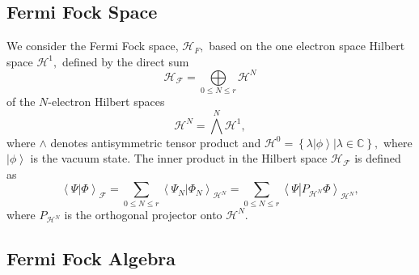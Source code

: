 \documentclass[aps,preprint]{revtex4}%
\begin{document}
\subsection{Fermi Fock Space \label{Fermi Fock Space}}

We consider the Fermi Fock space, $\mathcal{H}_{F},$ based on the one electron
space Hilbert space $\mathcal{H}^{1},$ defined by the direct sum
\begin{equation}
\mathcal{H}_{\mathcal{F}}=\underset{0\leq N\leq r}{\bigoplus}\mathcal{H}^{N}%
\end{equation}
of the $N$-electron Hilbert spaces
\begin{equation}
\mathcal{H}^{N}=\bigwedge\limits^{N}\mathcal{H}^{1},
\end{equation}
where $\wedge$ denotes antisymmetric tensor product and $\mathcal{H}%
^{0}=\left\{  \left.  \lambda\left\vert \phi\right\rangle \right\vert
\lambda\in\mathbb{C}\right\}  ,$ where $\left\vert \phi\right\rangle $ is the
vacuum state. The inner product in the Hilbert space $\mathcal{H}%
_{\mathcal{F}}$ is defined as
\begin{equation}
\left\langle \Psi\left\vert \Phi\right.  \right\rangle _{\mathcal{F}}%
=\sum_{0\leq N\leq r}\left\langle \Psi_{N}\left\vert \Phi_{N}\right.
\right\rangle _{\mathcal{H}^{N}}=\sum_{0\leq N\leq r}\left\langle
\Psi\left\vert P_{\mathcal{H}^{N}}\Phi\right.  \right\rangle _{\mathcal{H}%
^{N}},
\end{equation}
where $P_{\mathcal{H}^{N}}$ is the orthogonal projector onto $\mathcal{H}%
^{N}.$

\subsection{Fermi Fock Algebra \label{Fermi Fock Alg}}
\end{document}
